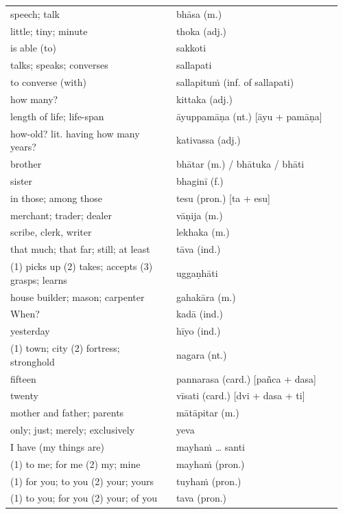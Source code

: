 \documentclass[11pt,oneside]{memoir}
\begin{document}
\begin{longtable}{L{0.48\linewidth} L{0.48\linewidth}}
speech; talk & bhāsa (m.)\\
little; tiny; minute & thoka (adj.)\\
is able (to) & sakkoti\\
talks; speaks; converses & sallapati\\
to converse (with) & sallapituṁ (inf. of sallapati)\\
how many? & kittaka (adj.)\\
length of life; life-span & āyuppamāṇa (nt.) [āyu + pamāṇa]\\
how-old? lit. having how many years? & kativassa (adj.)\\
brother & bhātar (m.) / bhātuka / bhāti\\
sister & bhaginī (f.)\\
in those; among those & tesu (pron.) [ta + esu]\\
merchant; trader; dealer & vāṇija (m.)\\
scribe, clerk, writer & lekhaka (m.)\\
that much; that far; still; at least & tāva (ind.)\\
(1) picks up (2) takes; accepts (3) grasps; learns & uggaṇhāti\\
house builder; mason; carpenter & gahakāra (m.)\\
When? & kadā (ind.)\\
yesterday & hīyo (ind.)\\
(1) town; city (2) fortress; stronghold & nagara (nt.)\\
fifteen & pannarasa (card.) [pañca + dasa]\\
twenty & vīsati (card.) [dvi + dasa + ti]\\
mother and father; parents & mātāpitar (m.)\\
only; just; merely; exclusively & yeva\\
I have (my things are) & mayhaṁ \ldots{} santi\\
(1) to me; for me (2) my; mine & mayhaṁ (pron.)\\
(1) for you; to you (2) your; yours & tuyhaṁ (pron.)\\
(1) to you; for you (2) your; of you & tava (pron.)\\
\end{longtable}

\enlargethispage*{-\baselineskip}
\renewcommand{\arraystretch}{1.25}
\end{document}
